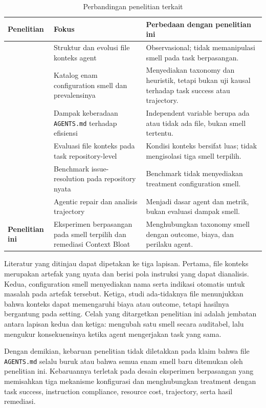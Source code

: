 \begin{table}[htbp]
\centering
\small
\renewcommand{\arraystretch}{1.25}
\caption{Perbandingan penelitian terkait}
\label{tab:related-work}
\begin{tabularx}{\textwidth}{p{3.3cm}p{3.4cm}Y}
\toprule
\textbf{Penelitian} & \textbf{Fokus} & \textbf{Perbedaan dengan penelitian ini} \\
\midrule
\cite{agentreadmes2025} & Struktur dan evolusi file konteks agent & Observasional; tidak memanipulasi smell pada task berpasangan. \\
\cite{configsmells2026} & Katalog enam configuration smell dan prevalensinya & Menyediakan taxonomy dan heuristik, tetapi bukan uji kausal terhadap task success atau trajectory. \\
\cite{lulla2026agents} & Dampak keberadaan \texttt{AGENTS.md} terhadap efisiensi & Independent variable berupa ada atau tidak ada file, bukan smell tertentu. \\
\cite{gloaguen2026agents} & Evaluasi file konteks pada task repository-level & Kondisi konteks bersifat luas; tidak mengisolasi tiga smell terpilih. \\
\cite{jimenez2024swebench} & Benchmark issue-resolution pada repository nyata & Benchmark tidak menyediakan treatment configuration smell. \\
\cite{repairagent2025,bouzenia2025trajectories} & Agentic repair dan analisis trajectory & Menjadi dasar agent dan metrik, bukan evaluasi dampak smell. \\
\textbf{Penelitian ini} & Eksperimen berpasangan pada smell terpilih dan remediasi Context Bloat & Menghubungkan taxonomy smell dengan outcome, biaya, dan perilaku agent. \\
\bottomrule
\end{tabularx}
\end{table}

Literatur yang ditinjau dapat dipetakan ke tiga lapisan. Pertama, file konteks merupakan artefak yang nyata dan berisi pola instruksi yang dapat dianalisis. Kedua, configuration smell menyediakan nama serta indikasi otomatis untuk masalah pada artefak tersebut. Ketiga, studi ada-tidaknya file menunjukkan bahwa konteks dapat memengaruhi biaya atau outcome, tetapi hasilnya bergantung pada setting. Celah yang ditargetkan penelitian ini adalah jembatan antara lapisan kedua dan ketiga: mengubah satu smell secara auditabel, lalu mengukur konsekuensinya ketika agent mengerjakan task yang sama.

Dengan demikian, kebaruan penelitian tidak diletakkan pada klaim bahwa file \texttt{AGENTS.md} selalu buruk atau bahwa semua enam smell baru ditemukan oleh penelitian ini. Kebaruannya terletak pada desain eksperimen berpasangan yang memisahkan tiga mekanisme konfigurasi dan menghubungkan treatment dengan task success, instruction compliance, resource cost, trajectory, serta hasil remediasi.
